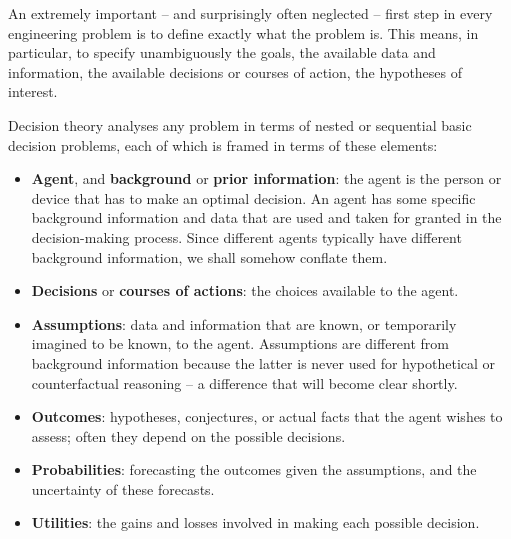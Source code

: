 \documentclass[
  a4paper,
  DIV=11,
  numbers=noendperiod,
  oneside]{scrreprt}
\begin{document}
An extremely important -- and surprisingly often neglected -- first step
in every engineering problem is to define exactly what the problem is.
This means, in particular, to specify unambiguously the goals, the
available data and information, the available decisions or courses of
action, the hypotheses of interest.

Decision theory analyses any problem in terms of nested or sequential
basic decision problems, each of which is framed in terms of these
elements:


\begin{itemize}
\item
  {\textbf{Agent}}, and {\textbf{background}} or {\textbf{prior
  information}}: the agent is the person or device that has to make an
  optimal decision. An agent has some specific background information
  and data that are used and taken for granted in the decision-making
  process. Since different agents typically have different background
  information, we shall somehow conflate them.
\item
  {\textbf{Decisions}} or {\textbf{courses of actions}}: the choices
  available to the agent.
\item
  {\textbf{Assumptions}}: data and information that are known, or
  temporarily imagined to be known, to the agent. Assumptions are
  different from background information because the latter is never used
  for hypothetical or counterfactual reasoning -- a difference that will
  become clear shortly.
\item
  {\textbf{Outcomes}}: hypotheses, conjectures, or actual facts that the
  agent wishes to assess; often they depend on the possible decisions.
\item
  {\textbf{Probabilities}}: forecasting the outcomes given the
  assumptions, and the uncertainty of these forecasts.
\item
  {\textbf{Utilities}}: the gains and losses involved in making each
  possible decision.
\end{itemize}
\end{document}
